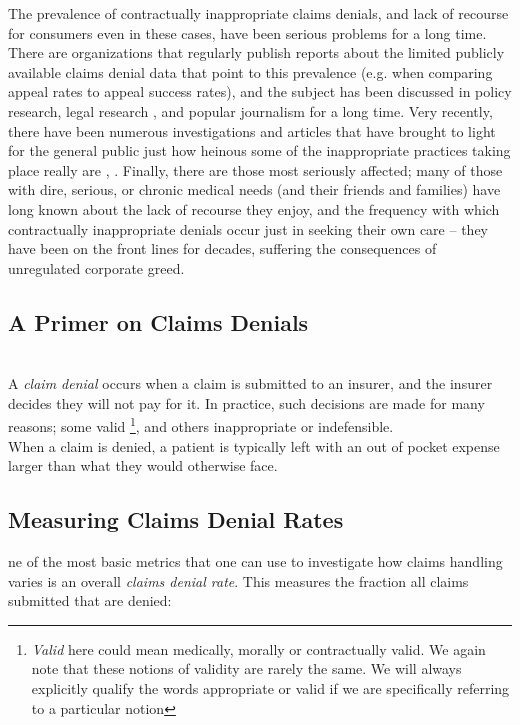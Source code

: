 \documentclass[psamsfonts]{amsart}
\theoremstyle{plain}
\theoremstyle{definition}
\theoremstyle{remark}
\begin{document}
The prevalence of contractually inappropriate claims denials, and lack of recourse for consumers even in these cases, have been serious problems for a long time. There are organizations that regularly publish reports \cite{pollitz2021} about the limited publicly available claims denial data that point to this prevalence (e.g. when comparing appeal rates to appeal success rates), and the subject has been discussed in policy research, legal research \cite{fox2010}, and popular journalism \cite{konrad2010} for a long time. Very recently, there have been numerous investigations and articles that have brought to light for the general public just how heinous some of the inappropriate practices taking place really are \cite{armstrong2023a}, \cite{armstrong2023b}. Finally, there are those most seriously affected; many of those with dire, serious, or chronic medical needs (and their friends and families) have long known about the lack of recourse they enjoy, and the frequency with which contractually inappropriate denials occur just in seeking their own care -- they have been on the front lines for decades, suffering the consequences of unregulated corporate greed.\\
	
\subsection{A Primer on Claims Denials}
\hfill\\

\indent A \emph{claim denial} occurs when a claim is submitted to an insurer, and the insurer decides they will not pay for it. In practice, such decisions are made for many reasons; some valid \footnote{\emph{Valid} here could mean medically, morally or contractually valid. We again note that these notions of validity are rarely the same. We will always explicitly qualify the words appropriate or valid if we are specifically referring to a particular notion}, and others inappropriate or indefensible.\\

When a claim is denied, a patient is typically left with an out of pocket expense larger than what they would otherwise face.

\subsection{Measuring Claims Denial Rates}

ne of the most basic metrics that one can use to investigate how claims handling varies is an overall \emph{claims denial rate}. This measures the fraction all claims submitted that are denied:
\end{document}
